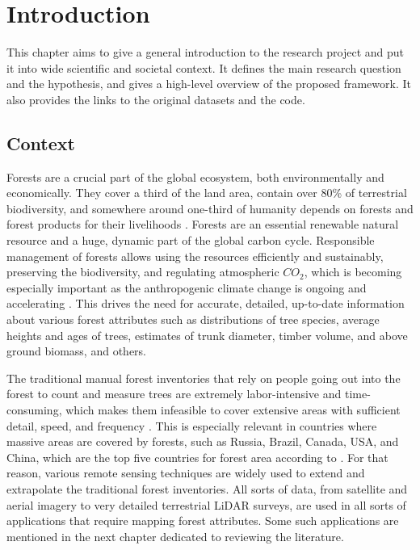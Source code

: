 \chapter{Introduction}\label{cap:introduction}

This chapter aims to give a general introduction to the research project and put it into wide scientific and societal context.
It defines the main research question and the hypothesis, and gives a high-level overview of the proposed framework.
It also provides the links to the original datasets and the code.

\section{Context}

Forests are a crucial part of the global ecosystem, both environmentally and economically.
They cover a third of the land area, contain over 80\% of terrestrial biodiversity, and somewhere around one-third of humanity depends on forests and forest products for their livelihoods \citep{aertsForestRestorationBiodiversity2011, StateWorldsForests2020}.
Forests are an essential renewable natural resource and a huge, dynamic part of the global carbon cycle.
Responsible management of forests allows using the resources efficiently and sustainably, preserving the biodiversity, and regulating atmospheric $CO_2$, which is becoming especially important as the anthropogenic climate change is ongoing and accelerating \citep{faheyForestCarbonStorage2010, forsterIndicatorsGlobalClimate2024}.
This drives the need for accurate, detailed, up-to-date information about various forest attributes such as distributions of tree species, average heights and ages of trees, estimates of trunk diameter, timber volume, and above ground biomass, and others.

The traditional manual forest inventories that rely on people going out into the forest to count and measure trees are extremely labor-intensive and time-consuming, which makes them infeasible to cover extensive areas with sufficient detail, speed, and frequency \citep{burleyEncyclopediaForestSciences2004}.
This is especially relevant in countries where massive areas are covered by forests, such as Russia, Brazil, Canada, USA, and China, which are the top five countries for forest area according to \citet{GlobalForestResources2020}.
For that reason, various remote sensing techniques are widely used to extend and extrapolate the traditional forest inventories.
All sorts of data, from satellite and aerial imagery to very detailed terrestrial LiDAR surveys, are used in all sorts of applications that require mapping forest attributes.
Some such applications are mentioned in the next chapter dedicated to reviewing the literature.

